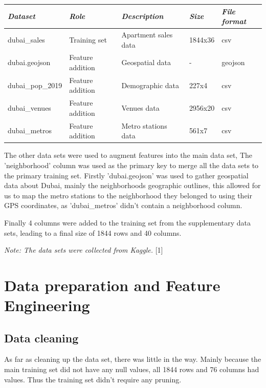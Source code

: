 \documentclass[conference]{IEEEtran}
\begin{document}
\smallbreak
\smallbreak
\smallbreak
\scriptsize
\begin{tabular}{|l|l|l|l|l|}

\hline
\textit{\textbf{Dataset}} & \textit{\textbf{Role}} & \textit{\textbf{Description}} & \textit{\textbf{Size}} & \textit{\textbf{File format}} \\ \hline
dubai\_sales     & Training set            & Apartment sales data & 1844x36  & csv     \\ \hline
dubai.geojson    & Feature addition & Geospatial data      & - & geojson \\ \hline
dubai\_pop\_2019 & Feature addition & Demographic data     &  227x4 & csv     \\ \hline
dubai\_venues    & Feature addition & Venues data          &  2956x20 & csv     \\ \hline
dubai\_metros    & Feature addition & Metro stations data  &  561x7 & csv     \\ \hline

\end{tabular}
\smallbreak
{}
\smallbreak
\normalsize
The other data sets were used to augment features into the main data set, The 'neighborhood' column was used as the primary key to merge all the data sets to the primary training set. Firstly 'dubai.geojson' was used to gather geospatial data about Dubai, mainly the neighborhoods geographic outlines, this allowed for us to map the metro stations to the neighborhood they belonged to using their GPS coordinates, as 'dubai\_metros' didn't contain a neighborhood column. 

Finally 4 columns were added to the training set from the supplementary data sets, leading to a final size of 1844 rows and 40 columns.

\textit{Note: The data sets were collected from Kaggle.} [1]

\section{Data preparation and Feature Engineering}
\subsection{Data cleaning}

As far as cleaning up the data set, there was little in the way. Mainly because the main training set did not have any null values, all 1844 rows and 76 columns had values. Thus the training set didn't require any pruning.
\end{document}
